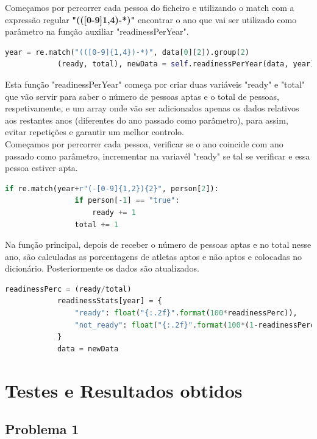 \documentclass[11pt,a4paper]{report}%
\begin{document}
\begin{enumerate}
\begin{enumerate}[a)]
		Começamos por percorrer cada pessoa do ficheiro e utilizando o match com a expressão regular \textbf{"(([0-9]{1,4})-*)"} encontrar o ano que vai ser utilizado como parâmetro na função auxiliar "readinessPerYear".
		\begin{lstlisting}[language=python]
			year = re.match("(([0-9]{1,4})-*)", data[0][2]).group(2)
			(ready, total), newData = self.readinessPerYear(data, year)
		\end{lstlisting}
		Esta função "readinessPerYear" começa por criar duas variáveis "ready" e "total" que vão servir para saber o número de pessoas aptas e o total de pessoas, respetivamente, e um array onde vão ser adicionados apenas os dados relativos aos restantes anos (diferentes do ano passado como parâmetro), para assim, evitar repetições e garantir um melhor controlo.\\
		Começamos por percorrer cada pessoa, verificar se o ano coincide com ano passado como parâmetro, incrementar na variavél "ready" se tal se verificar e essa pessoa estiver apta.
		\begin{lstlisting}[language=python]
			if re.match(year+r"(-[0-9]{1,2}){2}", person[2]):
				if person[-1] == "true":
					ready += 1
				total += 1
		\end{lstlisting}
	
		Na função principal, depois de receber o número de pessoas aptas e no total nesse ano, são calculadas as porcentagens de atletas aptos e não aptos e colocadas no dicionário. Posteriormente os dados são atualizados.
		\begin{lstlisting}[language=python]
			readinessPerc = (ready/total)
			readinessStats[year] = {
				"ready": float("{:.2f}".format(100*readinessPerc)),
				"not_ready": float("{:.2f}".format(100*(1-readinessPerc)))
			}
			data = newData
		\end{lstlisting}
		
	\end{enumerate}
	
\end{enumerate}



\chapter{Testes e Resultados obtidos}

\section{Problema 1}
\end{document}
